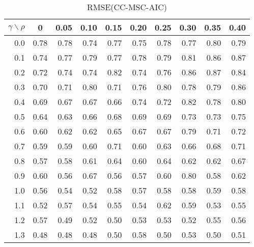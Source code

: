 \documentclass[12pt]{article}
\begin{document}
%
\begin{table}[!tbp]
\caption{RMSE(CC-MSC-AIC)}
 \begin{center}
 \begin{tabular}{r|rrrrrrrrr}\hline\hline
\multicolumn{1}{c|}{$\gamma\backslash\rho$}&\multicolumn{1}{c}{0}&\multicolumn{1}{c}{0.05}&\multicolumn{1}{c}{0.10}&\multicolumn{1}{c}{0.15}&\multicolumn{1}{c}{0.20}&\multicolumn{1}{c}{0.25}&\multicolumn{1}{c}{0.30}&\multicolumn{1}{c}{0.35}&\multicolumn{1}{c}{0.40}\tabularnewline
\hline

0.0&0.78&0.78&0.74&0.77&0.75&0.78&0.77&0.80&0.79\tabularnewline
0.1&0.74&0.77&0.79&0.77&0.78&0.79&0.81&0.86&0.87\tabularnewline
0.2&0.72&0.74&0.74&0.82&0.74&0.76&0.86&0.87&0.84\tabularnewline
0.3&0.70&0.71&0.80&0.71&0.76&0.80&0.78&0.79&0.86\tabularnewline
0.4&0.69&0.67&0.67&0.66&0.74&0.72&0.82&0.78&0.80\tabularnewline
0.5&0.64&0.63&0.66&0.68&0.69&0.69&0.73&0.73&0.75\tabularnewline
0.6&0.60&0.62&0.62&0.65&0.67&0.67&0.79&0.71&0.72\tabularnewline
0.7&0.59&0.59&0.60&0.71&0.60&0.63&0.66&0.68&0.71\tabularnewline
0.8&0.57&0.58&0.61&0.64&0.60&0.64&0.62&0.62&0.67\tabularnewline
0.9&0.60&0.56&0.67&0.56&0.57&0.60&0.80&0.58&0.62\tabularnewline
1.0&0.56&0.54&0.52&0.58&0.57&0.58&0.58&0.59&0.58\tabularnewline
1.1&0.52&0.57&0.54&0.55&0.54&0.62&0.59&0.53&0.55\tabularnewline
1.2&0.57&0.49&0.52&0.50&0.53&0.53&0.52&0.55&0.56\tabularnewline
1.3&0.48&0.48&0.48&0.50&0.58&0.50&0.53&0.50&0.51\tabularnewline
\hline
\end{tabular}

\end{center}

\end{table}
\end{document}
